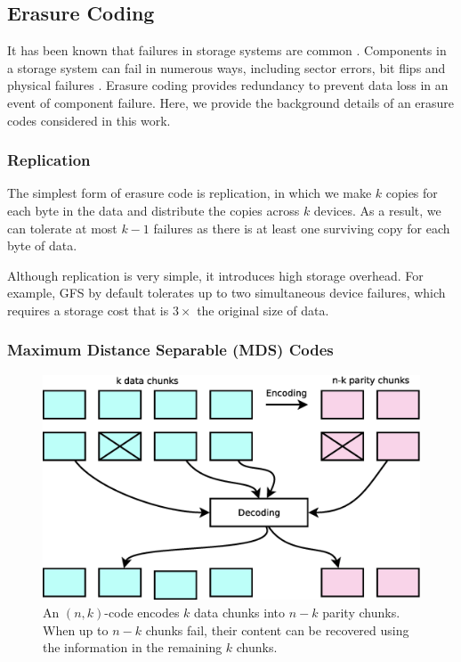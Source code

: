 
\subsection{Erasure Coding}
\label{sec:ec_background}

It has been known that failures in storage systems are common \cite{ghemawat03}.
Components in a storage system can fail in numerous ways, including sector
errors, bit flips and physical failures \cite{plank13}. Erasure coding provides
redundancy to prevent data loss in an event of component failure. Here, we
provide the background details of an erasure codes considered in
this work. 

\subsubsection{Replication}

The simplest form of erasure code is replication, in which we make $k$ copies
for each byte in the data and distribute the copies across $k$ devices. As a
result, we can tolerate at most $k-1$ failures as there is at least one
surviving copy for each byte of data.

Although replication is very simple, it introduces high storage overhead. For
example, GFS \cite{ghemawat03} by default tolerates up to two simultaneous
device failures, which requires a storage cost that is $3\times$ the original
size of data.

\subsubsection{Maximum Distance Separable (MDS) Codes}


\begin{figure}[t]
    \centering
    \includegraphics[width=0.7\linewidth]{figs/erasure_code}
    \caption{An $(n,k)$-code encodes $k$ data chunks into $n-k$ parity chunks.
        When up to $n-k$ chunks fail, their content can be recovered using the
        information in the remaining $k$ chunks.}
    \label{fig:erasure_code}
\end{figure}

